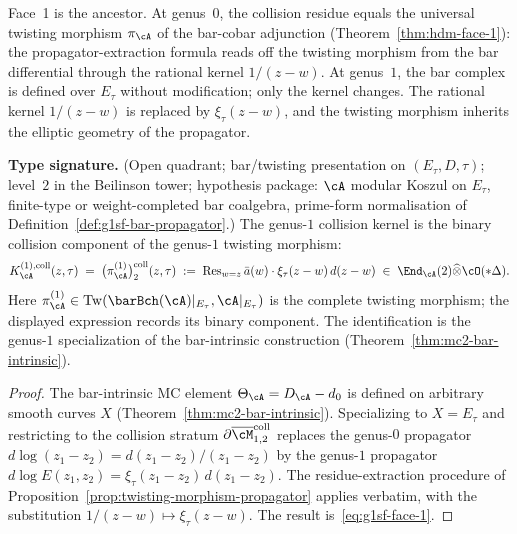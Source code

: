 Face~1 is the ancestor. At genus~$0$, the collision residue equals
the universal twisting morphism $\pi_\cA$ of the bar-cobar adjunction
(Theorem~\ref{thm:hdm-face-1}): the propagator-extraction formula
reads off the twisting morphism from the bar differential through the
rational kernel $1/(z-w)$. At genus~$1$, the bar complex is defined
over $E_\tau$ without modification; only the kernel changes. The
rational kernel $1/(z-w)$ is replaced by $\xi_\tau(z-w)$, and the
twisting morphism inherits the elliptic geometry of the propagator.

\begin{theorem}
\label{thm:g1sf-face-1}
\textbf{Type signature.} (Open quadrant; bar/twisting presentation on
$(E_\tau, D, \tau)$; level~$2$ in the Beilinson tower; hypothesis
package: $\cA$ modular Koszul on $E_\tau$, finite-type or
weight-completed bar coalgebra, prime-form normalisation of
Definition~\ref{def:g1sf-bar-propagator}.)
The genus-$1$ collision kernel is the binary collision component of
the genus-$1$ twisting morphism:
\begin{equation}\label{eq:g1sf-face-1}
K_\cA^{(1),\mathrm{coll}}(z, \tau)
\;=\;
\bigl(\pi_\cA^{(1)}\bigr)_{2}^{\mathrm{coll}}(z,\tau)
\;:=\;
\operatorname{Res}_{w=z}
\bar{a}(w) \cdot \xi_\tau(z - w)\, d(z-w)
\;\in\;\End_\cA(2)\widehat\otimes\cO(*\Delta).
\end{equation}
Here $\pi_\cA^{(1)}\in
\mathrm{Tw}(\barBch(\cA)|_{E_\tau},\cA|_{E_\tau})$ is the complete
twisting morphism; the displayed expression records its binary
component.
The identification is the genus-$1$ specialization of the
bar-intrinsic construction
(Theorem~\textup{\ref{thm:mc2-bar-intrinsic}}).
\end{theorem}

\begin{proof}
The bar-intrinsic MC element $\Theta_\cA = D_\cA - d_0$ is defined
on arbitrary smooth curves $X$
(Theorem~\ref{thm:mc2-bar-intrinsic}). Specializing to
$X = E_\tau$ and restricting to the collision stratum
$\partial\overline{\cM}_{1,2}^{\mathrm{coll}}$ replaces the
genus-$0$ propagator $d\log(z_1 - z_2) = d(z_1-z_2)/(z_1-z_2)$ by
the genus-$1$ propagator
$d\log E(z_1, z_2) = \xi_\tau(z_1-z_2)\, d(z_1-z_2)$. The
residue-extraction procedure of
Proposition~\ref{prop:twisting-morphism-propagator} applies
verbatim, with the substitution $1/(z-w) \mapsto \xi_\tau(z-w)$.
The result is~\eqref{eq:g1sf-face-1}.
\end{proof}

